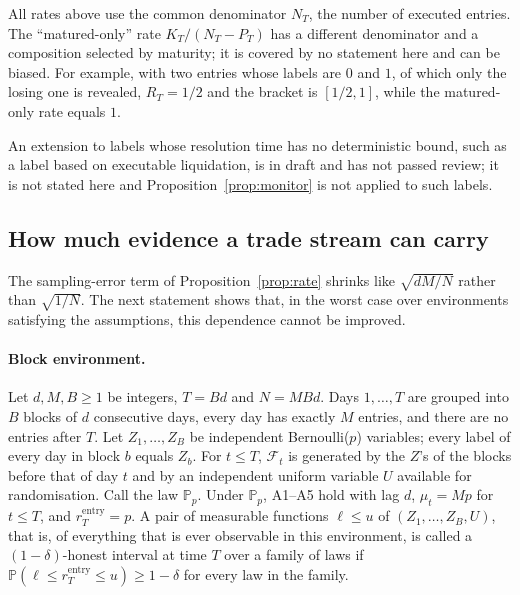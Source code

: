 \documentclass[11pt]{article}
\theoremstyle{remark}
\newcommand{\Prob}{\mathbb{P}}
\newcommand{\cF}{\mathcal{F}}
\newcommand{\rentry}{r_T^{\mathrm{entry}}}
\begin{document}
All rates above use the common denominator $N_T$, the number of executed entries. The
``matured-only'' rate $K_T/(N_T-P_T)$ has a different denominator and a composition selected by
maturity; it is covered by no statement here and can be biased. For example, with two entries
whose labels are $0$ and $1$, of which only the losing one is revealed, $R_T=1/2$ and the
bracket is $[1/2,1]$, while the matured-only rate equals $1$.

An extension to labels whose resolution time has no deterministic bound, such as a label based
on executable liquidation, is in draft and has not passed review; it is not stated here and
Proposition~\ref{prop:monitor} is not applied to such labels.

\subsection{How much evidence a trade stream can carry}

The sampling-error term of Proposition~\ref{prop:rate} shrinks like $\sqrt{dM/N}$ rather than
$\sqrt{1/N}$. The next statement shows that, in the worst case over environments satisfying the
assumptions, this dependence cannot be improved.

\paragraph{Block environment.}
Let $d,M,B\ge1$ be integers, $T=Bd$ and $N=MBd$. Days $1,\dots,T$ are grouped into $B$ blocks of
$d$ consecutive days, every day has exactly $M$ entries, and there are no entries after $T$. Let
$Z_1,\dots,Z_B$ be independent Bernoulli($p$) variables; every label of every day in block $b$
equals $Z_b$. For $t\le T$, $\cF_t$ is generated by the $Z$'s of the blocks before that of day
$t$ and by an independent uniform variable $U$ available for randomisation. Call the law
$\Prob_p$. Under $\Prob_p$, A1--A5 hold with lag $d$, $\mu_t=Mp$ for $t\le T$, and $\rentry=p$.
A pair of measurable functions $\ell\le u$ of $(Z_1,\dots,Z_B,U)$, that is, of everything that
is ever observable in this environment, is called a $(1-\delta)$-honest interval at time $T$
over a family of laws if $\Prob(\ell\le\rentry\le u)\ge1-\delta$ for every law in the family.
\end{document}
